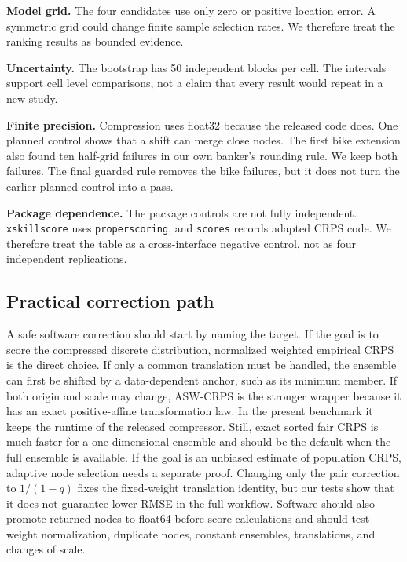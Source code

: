 \documentclass[11pt]{article}
\begin{document}
\textbf{Model grid.} The four candidates use only zero or positive location error. A symmetric grid could change finite sample selection rates. We therefore treat the ranking results as bounded evidence.

\textbf{Uncertainty.} The bootstrap has 50 independent blocks per cell. The intervals support cell level comparisons, not a claim that every result would repeat in a new study.

\textbf{Finite precision.} Compression uses float32 because the released code does. One planned control shows that a shift can merge close nodes. The first bike extension also found ten half-grid failures in our own banker's rounding rule. We keep both failures. The final guarded rule removes the bike failures, but it does not turn the earlier planned control into a pass.

\textbf{Package dependence.} The package controls are not fully independent. \texttt{xskillscore} uses \texttt{properscoring}, and \texttt{scores} records adapted CRPS code. We therefore treat the table as a cross-interface negative control, not as four independent replications.

\subsection*{Practical correction path}

A safe software correction should start by naming the target. If the goal is to score the compressed discrete distribution, normalized weighted empirical CRPS is the direct choice. If only a common translation must be handled, the ensemble can first be shifted by a data-dependent anchor, such as its minimum member. If both origin and scale may change, ASW-CRPS is the stronger wrapper because it has an exact positive-affine transformation law. In the present benchmark it keeps the runtime of the released compressor. Still, exact sorted fair CRPS is much faster for a one-dimensional ensemble and should be the default when the full ensemble is available. If the goal is an unbiased estimate of population CRPS, adaptive node selection needs a separate proof. Changing only the pair correction to $1/(1-q)$ fixes the fixed-weight translation identity, but our tests show that it does not guarantee lower RMSE in the full workflow. Software should also promote returned nodes to float64 before score calculations and should test weight normalization, duplicate nodes, constant ensembles, translations, and changes of scale.
\end{document}
